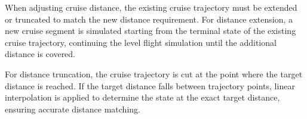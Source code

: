 When adjusting cruise distance, the existing cruise trajectory must be extended or truncated to match the new distance requirement. For distance extension, a new cruise segment is simulated starting from the terminal state of the existing cruise trajectory, continuing the level flight simulation until the additional distance is covered.

For distance truncation, the cruise trajectory is cut at the point where the target distance is reached. If the target distance falls between trajectory points, linear interpolation is applied to determine the state at the exact target distance, ensuring accurate distance matching.

